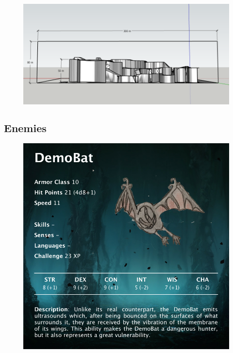 \begin{figure}[H]
	\centering
	\includegraphics[width=14cm]{images/map/3D_map_half.png}
\end{figure}
\newpage


\subsection{Enemies}

\vspace*{0.3cm}

\begin{figure}[H]
	\centering
	\includegraphics[width=0.7\linewidth]{images/visual_stats/demobat.png}
\end{figure}



